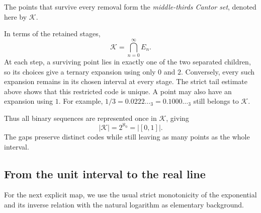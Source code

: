 The points that survive every removal form the \emph{middle-thirds
Cantor set}, denoted here by $\mathcal K$.

In terms of the retained stages,
\[
  \mathcal K=\bigcap_{n=0}^{\infty}E_n.
\]
At each step, a surviving point lies in exactly one of the two separated
children, so its choices give a ternary expansion using only $0$ and $2$.
Conversely, every such expansion remains in its chosen interval at every
stage. The strict tail estimate above shows that this restricted code is
unique. A point may also have an expansion using $1$. For example,
$1/3=0.0222\ldots{}_3=0.1000\ldots{}_3$ still belongs to $\mathcal K$.

Thus all binary sequences are represented once in $\mathcal K$, giving
\[
  |\mathcal K|=2^{\aleph_0}=|[0,1]|.
\]
The gaps preserve distinct codes while still leaving as many points as
the whole interval.


\subsection{From the unit interval to the real line}

For the next explicit map, we use the usual strict
monotonicity of the exponential and its inverse relation with the
natural logarithm as elementary background.

